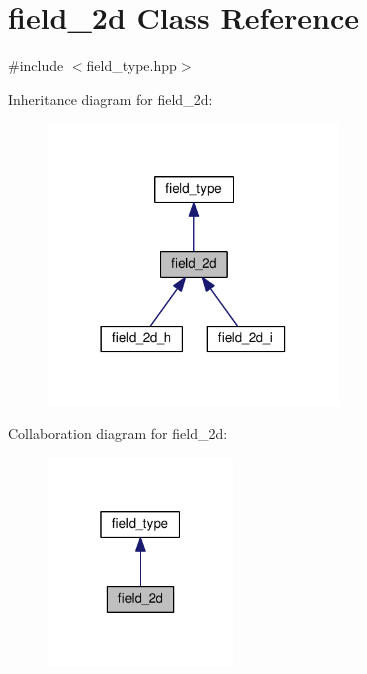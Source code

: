 \hypertarget{classfield__2d}{}\section{field\+\_\+2d Class Reference}
\label{classfield__2d}


{\ttfamily \#include $<$field\+\_\+type.\+hpp$>$}



Inheritance diagram for field\+\_\+2d\+:\nopagebreak
\begin{figure}[H]
\begin{center}
\leavevmode
\includegraphics[width=218pt]{d1/de5/classfield__2d__inherit__graph}
\end{center}
\end{figure}


Collaboration diagram for field\+\_\+2d\+:\nopagebreak
\begin{figure}[H]
\begin{center}
\leavevmode
\includegraphics[width=139pt]{d4/d0c/classfield__2d__coll__graph}
\end{center}
\end{figure}
